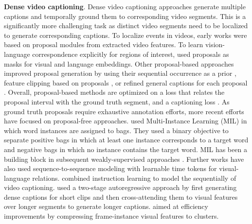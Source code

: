 \noindent
\textbf{Dense video captioning}. Dense video captioning approaches generate multiple captions and temporally ground them to corresponding video segments. This is a significantly more challenging task as distinct video segments need to be localized to generate corresponding captions. To localize events in videos, early works \citep{krishna2017dense,li2018jointly,shi2019dense,wang2018bidirectional,zhou2018end} were based on proposal modules from extracted video features. To learn vision-language correspondence explicitly for regions of interest, \citet{zhou2018end} used proposals as masks for visual and language embeddings. Other proposal-based approaches improved proposal generation by using their sequential occurrence as a prior \citep{mun2019streamlined}, feature clipping based on proposals \citep{iashin2020better,iashin2020multi}, or refined general captions for each proposal \citep{deng2021sketch}. Overall, proposal-based methods are optimized on a loss that relates the proposal interval with the ground truth segment, and a captioning loss%
. As ground truth proposals require exhaustive annotation efforts, more recent efforts have focused on proposal-free approaches. \citet{shen2017weakly} used Multi-Instance Learning (MIL) in which word instances are assigned to bags. They used a binary objective to separate positive bags in which at least one instance corresponds to a target word and negative bags in which no instance contains the target word. MIL has been a building block in subsequent weakly-supervised approaches \citep{chen2021towards}. Further works \citep{yang2023vid2seq,ren2024timechat} have also used sequence-to-sequence modeling with learnable time tokens for visual-language relations. \citet{mavroudi2023learning} combined instruction learning to model the sequentially of video captioning. \citet{islam2024video} used a two-stage autoregressive approach by first generating dense captions for short clips and then cross-attending them to visual features over longer segments to generate longer captions. \citet{zhou2024streaming} aimed at efficiency improvements by compressing frame-instance visual features to clusters.


